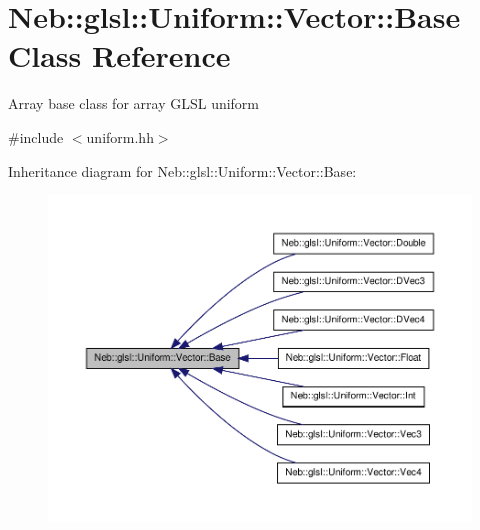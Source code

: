 \hypertarget{classNeb_1_1glsl_1_1Uniform_1_1Vector_1_1Base}{\section{\-Neb\-:\-:glsl\-:\-:\-Uniform\-:\-:\-Vector\-:\-:\-Base \-Class \-Reference}
\label{classNeb_1_1glsl_1_1Uniform_1_1Vector_1_1Base}
}


\-Array base class for array \-G\-L\-S\-L uniform  




{\ttfamily \#include $<$uniform.\-hh$>$}



\-Inheritance diagram for \-Neb\-:\-:glsl\-:\-:\-Uniform\-:\-:\-Vector\-:\-:\-Base\-:\nopagebreak
\begin{figure}[H]
\begin{center}
\leavevmode
\includegraphics[width=350pt]{classNeb_1_1glsl_1_1Uniform_1_1Vector_1_1Base__inherit__graph}
\end{center}
\end{figure}
